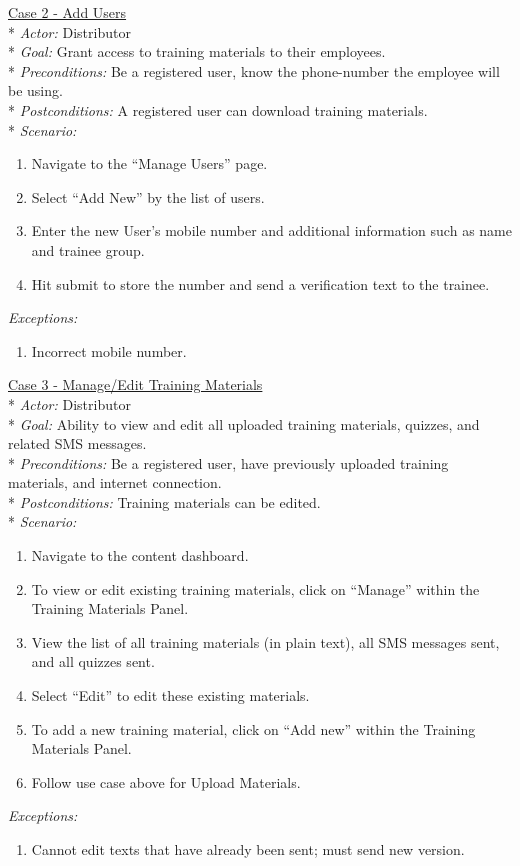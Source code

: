 \underline{Case 2 - Add Users}\\*
\textit{Actor:} Distributor\\*
\textit{Goal:} Grant access to training materials to their employees.\\*
\textit{Preconditions:} Be a registered user, know the phone-number the employee will be using.\\*
\textit{Postconditions:} A registered user can download training materials.\\*
\textit{Scenario:}
\begin{enumerate}
	\item{Navigate to the “Manage Users” page.}
	\item{Select “Add New” by the list of users.}
	\item{Enter the new User’s mobile number and additional information such as name and trainee group.}
	\item{Hit submit to store the number and send a verification text to the trainee.}
\end{enumerate}
\textit{Exceptions:}
\begin{enumerate}
	\item{Incorrect mobile number.}\\
\end{enumerate}

\underline{Case 3 - Manage/Edit Training Materials}\\*
\textit{Actor:} Distributor\\*
\textit{Goal:} Ability to view and edit all uploaded training materials, quizzes, and related SMS messages.\\*
\textit{Preconditions:} Be a registered user, have previously uploaded training materials, and internet connection.\\*
\textit{Postconditions:} Training materials can be edited.\\*
\textit{Scenario:}
\begin{enumerate}
	\item{Navigate to the content dashboard.}
	\item{To view or edit existing training materials, click on “Manage” within the Training Materials Panel.}
	\item{View the list of all training materials (in plain text), all SMS messages sent, and all quizzes sent.}
	\item{Select “Edit” to edit these existing materials.}
	\item{To add a new training material, click on “Add new” within the Training Materials Panel.}
	\item{Follow use case above for Upload Materials.}
\end{enumerate}
\textit{Exceptions:}
\begin{enumerate}
	\item{Cannot edit texts that have already been sent; must send new version.}\\
\end{enumerate}

